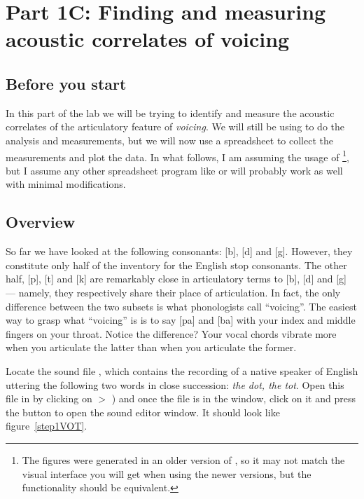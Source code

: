 \section{Part 1C: Finding and measuring acoustic correlates of voicing}

\subsection{Before you start}

In this part of the lab we will be trying to identify and measure the acoustic correlates of the articulatory feature of \emph{voicing}. We will still be using \Praat{} to do the analysis and measurements, but we will now use a spreadsheet to collect the measurements and plot the data. In what follows, I am assuming the usage of \MSExcel{}\footnote{The figures were generated in an older version of \MSExcel{}, so it may not match the visual interface you will get when using the newer versions, but the functionality should be equivalent.}, but I assume any other spreadsheet program like \OpOff{} or \Gsheet{} will probably work as well with minimal modifications.

\subsection{Overview}

So far we have looked at the following consonants: [b], [d] and [g]. However, they constitute only half of the inventory for the English stop consonants. The other half, [p], [t] and [k] are remarkably close in articulatory terms to [b], [d] and [g] --- namely, they respectively share their place of articulation. In fact, the only difference between the two subsets is what phonologists call ``voicing''. The easiest way to grasp what ``voicing'' is is to say [pa] and [ba] with your index and middle fingers on your throat. Notice the difference? Your vocal chords vibrate more when you articulate the latter than when you articulate the former.

Locate the sound file , which contains the recording of a native speaker of English uttering the following two words in close succession: \emph{the dot, the tot}. Open this file in \Praat{} by clicking on  $>$ ) and once the file is in the  window, click on it and press the  button to open the sound editor window. It should look like figure~\ref{step1VOT}.

